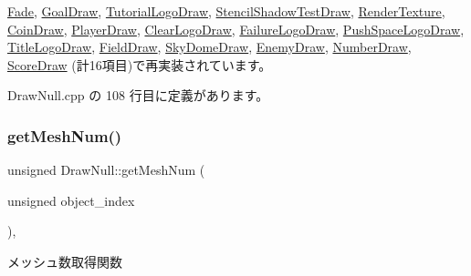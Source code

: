 \mbox{\hyperlink{class_fade_a84a9e688650ac500e03cde74ff0210b8}{Fade}}, \mbox{\hyperlink{class_goal_draw_a554c826d7a4534ee489dfe18edf7ee0e}{Goal\+Draw}}, \mbox{\hyperlink{class_tutorial_logo_draw_aa808cfb8bc59d58bbd698a195603429f}{Tutorial\+Logo\+Draw}}, \mbox{\hyperlink{class_stencil_shadow_test_draw_abb5f9445b7d94c213a3751fa57e36643}{Stencil\+Shadow\+Test\+Draw}}, \mbox{\hyperlink{class_render_texture_a529ab829c676470ae5764b42cba9efb0}{Render\+Texture}}, \mbox{\hyperlink{class_coin_draw_ac7d91fecb6845cebe276eb81a4953563}{Coin\+Draw}}, \mbox{\hyperlink{class_player_draw_a8b9e8caa6bea7295f58a0aaddeb9458b}{Player\+Draw}}, \mbox{\hyperlink{class_clear_logo_draw_ab018f370071f370ae7016d8ee402c456}{Clear\+Logo\+Draw}}, \mbox{\hyperlink{class_failure_logo_draw_a8ee20e1697bbbaf7f41c18334830488a}{Failure\+Logo\+Draw}}, \mbox{\hyperlink{class_push_space_logo_draw_a647dddefc43d66cb3c720ee8fbb6a783}{Push\+Space\+Logo\+Draw}}, \mbox{\hyperlink{class_title_logo_draw_a01e4cb21d580bac86a226fa2e35bf4a3}{Title\+Logo\+Draw}}, \mbox{\hyperlink{class_field_draw_a1915497654d079074dbd3e058db06a78}{Field\+Draw}}, \mbox{\hyperlink{class_sky_dome_draw_a42364ea42618cbab588d55050edfe95a}{Sky\+Dome\+Draw}}, \mbox{\hyperlink{class_enemy_draw_a20a23c1c5fd5e510d15e8ca27aabd821}{Enemy\+Draw}}, \mbox{\hyperlink{class_number_draw_a15e4e602b3f9372349d0b6ff9e4fc423}{Number\+Draw}}, \mbox{\hyperlink{class_score_draw_a799e71943140a264cedba6002308b976}{Score\+Draw}} (計16項目)で再実装されています。



 Draw\+Null.\+cpp の 108 行目に定義があります。

\mbox{\label{class_draw_null_a4c566a37d27fac3dcf76c7970443f375}} 
\subsubsection{\texorpdfstring{get\+Mesh\+Num()}{getMeshNum()}}
{\footnotesize\ttfamily unsigned Draw\+Null\+::get\+Mesh\+Num (\begin{DoxyParamCaption}\item[{unsigned}]{object\+\_\+index }\end{DoxyParamCaption})\hspace{0.3cm}{\ttfamily [override]}, {\ttfamily [virtual]}}



メッシュ数取得関数 


